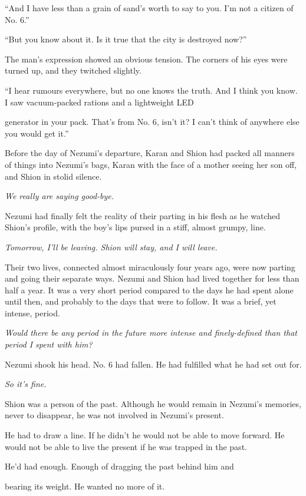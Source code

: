 ``And I have less than a grain of sand's worth to say to you. I'm not a
citizen of No. 6.''

``But you know about it. Is it true that the city is destroyed now?''~

The man's expression showed an obvious tension. The corners of his eyes
were turned up, and they twitched slightly.

``I hear rumours everywhere, but no one knows the truth. And I think you
know. I saw vacuum-packed rations and a lightweight LED~

generator in your pack. That's from No. 6, isn't it? I can't think of
anywhere else you would get it.''

Before the day of Nezumi's departure, Karan and Shion had packed all
manners of things into Nezumi's bags, Karan with the face of a mother
seeing her son off, and Shion in stolid silence.

\emph{We really are saying good-bye.}

Nezumi had finally felt the reality of their parting in his flesh as he
watched Shion's profile, with the boy's lips pursed in a stiff, almost
grumpy, line.

\emph{Tomorrow, I'll be leaving. Shion will stay, and I will leave.}

Their two lives, connected almost miraculously four years ago, were now
parting and going their separate ways. Nezumi and Shion had lived
together for less than half a year. It was a very short period compared
to the days he had spent alone until then, and probably to the days that
were to follow. It was a brief, yet intense, period.

\emph{Would there be any period in the future more intense and finely-defined
than that period I spent with him?}

Nezumi shook his head. No. 6 had fallen. He had fulfilled what he had
set out for.

\emph{So it's fine.}

Shion was a person of the past. Although he would remain in Nezumi's
memories, never to disappear, he was not involved in Nezumi's present.

He had to draw a line. If he didn't he would not be able to move
forward. He would not be able to live the present if he was trapped in
the past.

He'd had enough. Enough of dragging the past behind him and~

bearing its weight. He wanted no more of it.

